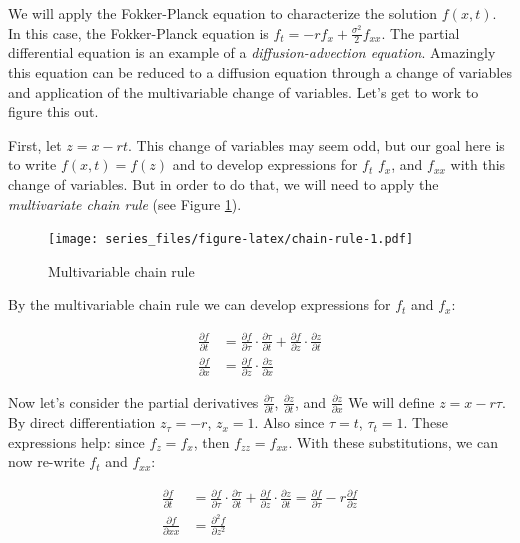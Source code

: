\documentclass[
]{book}
\theoremstyle{definition}
\theoremstyle{definition}
\theoremstyle{definition}
\theoremstyle{remark}
\begin{document}
We will apply the Fokker-Planck equation to characterize the solution \(f(x,t)\). In this case, the Fokker-Planck equation is \(\displaystyle f_{t} = -r f_{x}+ \frac{\sigma^{2}}{2} f_{xx}\). The partial differential equation is an example of a \emph{diffusion-advection equation}. Amazingly this equation can be reduced to a diffusion equation through a change of variables and application of the multivariable change of variables. Let's get to work to figure this out.

First, let \(z=x-rt\). This change of variables may seem odd, but our goal here is to write \(f(x,t)=f(z)\) and to develop expressions for \(f_{t}\) \(f_{x}\), and \(f_{xx}\) with this change of variables. But in order to do that, we will need to apply the \emph{multivariate chain rule} (see Figure \ref{fig:chain-rule}).

\begin{figure}
\centering
\texttt{[image: series\_files/figure-latex/chain-rule-1.pdf]}
\caption{\label{fig:chain-rule}Multivariable chain rule}
\end{figure}

By the multivariable chain rule we can develop expressions for \(f_{t}\) and \(f_{x}\):

\begin{align*}
\frac{\partial f}{\partial t} & = \frac{\partial f}{\partial \tau} \cdot \frac{ \partial \tau}{\partial t} + \frac{\partial f}{\partial z} \cdot \frac{ \partial z}{\partial t}  \\
\frac{\partial f}{\partial x} & = \frac{\partial f}{\partial z} \cdot \frac{ \partial z}{\partial x}
\end{align*}

Now let's consider the partial derivatives \(\displaystyle \frac{ \partial \tau}{\partial t}\), \(\displaystyle \frac{ \partial z}{\partial t}\), and \(\displaystyle \frac{ \partial z}{\partial x}\) We will define \(z=x-r\tau\). By direct differentiation \(z_{\tau} = -r\), \(z_{x} = 1\). Also since \(\tau=t\), \(\tau_{t}=1\). These expressions help: since \(f_{z}=f_{x}\), then \(f_{zz} = f_{xx}\). With these substitutions, we can now re-write \(f_{t}\) and \(f_{xx}\):

\begin{align*}
\frac{\partial f}{\partial t} & = \frac{\partial f}{\partial \tau} \cdot \frac{ \partial \tau}{\partial t} + \frac{\partial f}{\partial z} \cdot \frac{ \partial z}{\partial t}  = \frac{\partial f}{\partial \tau} -r \frac{\partial f}{\partial z} \\
\frac{\partial f}{\partial xx} & = \frac{\partial^{2} f}{\partial z^{2}} 
\end{align*}
\end{document}
